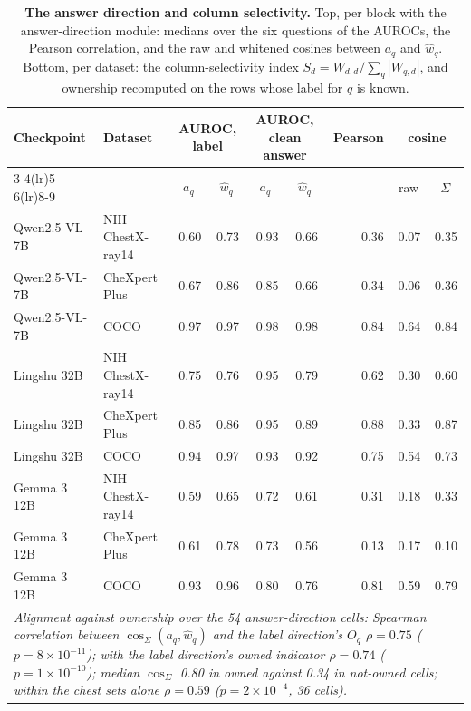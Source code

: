 \documentclass{article}
\begin{document}
\begin{table}[h]
\centering
\scriptsize
\setlength{\tabcolsep}{4pt}
\caption{\textbf{The answer direction and column selectivity.} Top, per block with the answer-direction module: medians over the six questions of the AUROCs, the Pearson correlation, and the raw and whitened cosines between $a_q$ and $\hat w_q$. Bottom, per dataset: the column-selectivity index $S_d=W_{d,d}/\sum_q|W_{q,d}|$, and ownership recomputed on the rows whose label for $q$ is known.}
\label{tab:cf-validation}
\begin{tabular}{llrrrrrrr}
\toprule
\multirow{2}{*}{Checkpoint} & \multirow{2}{*}{Dataset} & \multicolumn{2}{c}{AUROC, label} & \multicolumn{2}{c}{AUROC, clean answer} & \multirow{2}{*}{Pearson} & \multicolumn{2}{c}{cosine}\\
\cmidrule(lr){3-4}\cmidrule(lr){5-6}\cmidrule(lr){8-9}
&  & \multicolumn{1}{c}{$a_q$} & \multicolumn{1}{c}{$\hat w_q$} & \multicolumn{1}{c}{$a_q$} & \multicolumn{1}{c}{$\hat w_q$} &  & \multicolumn{1}{c}{raw} & \multicolumn{1}{c}{$\Sigma$}\\
\midrule
Qwen2.5-VL-7B & NIH ChestX-ray14 & 0.60 & 0.73 & 0.93 & 0.66 & 0.36 & 0.07 & 0.35 \\
Qwen2.5-VL-7B & CheXpert Plus & 0.67 & 0.86 & 0.85 & 0.66 & 0.34 & 0.06 & 0.36 \\
Qwen2.5-VL-7B & COCO & 0.97 & 0.97 & 0.98 & 0.98 & 0.84 & 0.64 & 0.84 \\
Lingshu 32B & NIH ChestX-ray14 & 0.75 & 0.76 & 0.95 & 0.79 & 0.62 & 0.30 & 0.60 \\
Lingshu 32B & CheXpert Plus & 0.85 & 0.86 & 0.95 & 0.89 & 0.88 & 0.33 & 0.87 \\
Lingshu 32B & COCO & 0.94 & 0.97 & 0.93 & 0.92 & 0.75 & 0.54 & 0.73 \\
Gemma 3 12B & NIH ChestX-ray14 & 0.59 & 0.65 & 0.72 & 0.61 & 0.31 & 0.18 & 0.33 \\
Gemma 3 12B & CheXpert Plus & 0.61 & 0.78 & 0.73 & 0.56 & 0.13 & 0.17 & 0.10 \\
Gemma 3 12B & COCO & 0.93 & 0.96 & 0.80 & 0.76 & 0.81 & 0.59 & 0.79 \\
\midrule
\multicolumn{9}{p{0.92\linewidth}}{\textit{Alignment against ownership over the 54 answer-direction cells: Spearman correlation between $\cos_\Sigma(a_q,\hat w_q)$ and the label direction's $O_q$ $\rho=0.75$ ($p=8\times10^{-11}$); with the label direction's owned indicator $\rho=0.74$ ($p=1\times10^{-10}$); median $\cos_\Sigma$ 0.80 in owned against 0.34 in not-owned cells; within the chest sets alone $\rho=0.59$ ($p=2\times10^{-4}$, 36 cells).}} \\

\end{tabular}
\end{table}
\end{document}
